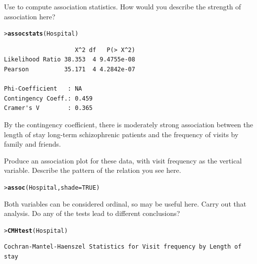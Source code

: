 \documentclass[10pt]{report}\usepackage[]{graphicx}\usepackage[]{color}
\makeatletter
\newcommand{\hlnum}[1]{\textcolor[rgb]{0.686,0.059,0.569}{#1}}%
\newcommand{\hlstd}[1]{\textcolor[rgb]{0.345,0.345,0.345}{#1}}%
\newcommand{\hlkwc}[1]{\textcolor[rgb]{0.333,0.667,0.333}{#1}}%
\newcommand{\hlkwd}[1]{\textcolor[rgb]{0.737,0.353,0.396}{\textbf{#1}}}%
\newenvironment{kframe}{%
 \def\at@end@of@kframe{}%
 \ifinner\ifhmode%
  \def\at@end@of@kframe{\end{minipage}}%
  \begin{minipage}{\columnwidth}%
 \fi\fi%
 \def\FrameCommand##1{\hskip\@totalleftmargin \hskip-\fboxsep
 \colorbox{shadecolor}{##1}\hskip-\fboxsep
     \hskip-\linewidth \hskip-\@totalleftmargin \hskip\columnwidth}%
 \MakeFramed {\advance\hsize-\width
   \@totalleftmargin\z@ \linewidth\hsize
   \@setminipage}}%
 {\par\unskip\endMakeFramed%
 \at@end@of@kframe}
\newenvironment{knitrout}{}{} %
\renewenvironment{knitrout}{\small\renewcommand{\baselinestretch}{.85}}{} %
\makeatother
\begin{document}
\begin{Exercises}
\begin{enumerate*}
      \item Use  to compute association statistics.
      How would you describe the strength of association here?
      \begin{ans}
\begin{knitrout}\footnotesize
{}\color{fgcolor}\begin{kframe}
\begin{alltt}
\hlstd{> }\hlkwd{assocstats}\hlstd{(Hospital)}
\end{alltt}
\begin{verbatim}
                    X^2 df   P(> X^2)
Likelihood Ratio 38.353  4 9.4755e-08
Pearson          35.171  4 4.2842e-07

Phi-Coefficient   : NA 
Contingency Coeff.: 0.459 
Cramer's V        : 0.365 
\end{verbatim}
\end{kframe}
\end{knitrout}
      By the contingency coefficient, there is moderately strong association between the length
      of stay long-term schizophrenic patients and the frequency of visits by family and friends.
      \end{ans}
      
      \item Produce an association plot for these data, with
      visit frequency as the vertical variable.  Describe the
      pattern of the relation you see here.
      \begin{ans}
\begin{knitrout}\footnotesize
{}\color{fgcolor}\begin{kframe}
\begin{alltt}
\hlstd{> }\hlkwd{assoc}\hlstd{(Hospital,} \hlkwc{shade}\hlstd{=}\hlnum{TRUE}\hlstd{)}
\end{alltt}


{\ttfamily\noindent\bfseries{}}\end{kframe}
\end{knitrout}
      \end{ans}
      
      \item Both variables can be considered ordinal, so
       may be useful here.  Carry out that
      analysis.  Do any of the tests lead to different conclusions?
      \begin{ans}
\begin{knitrout}\footnotesize
{}\color{fgcolor}\begin{kframe}
\begin{alltt}
\hlstd{> }\hlkwd{CMHtest}\hlstd{(Hospital)}
\end{alltt}
\begin{verbatim}
Cochran-Mantel-Haenszel Statistics for Visit frequency by Length of stay 


\end{verbatim}
\end{kframe}
\end{knitrout}
\end{ans}
\end{enumerate*}
\end{Exercises}
\end{document}
